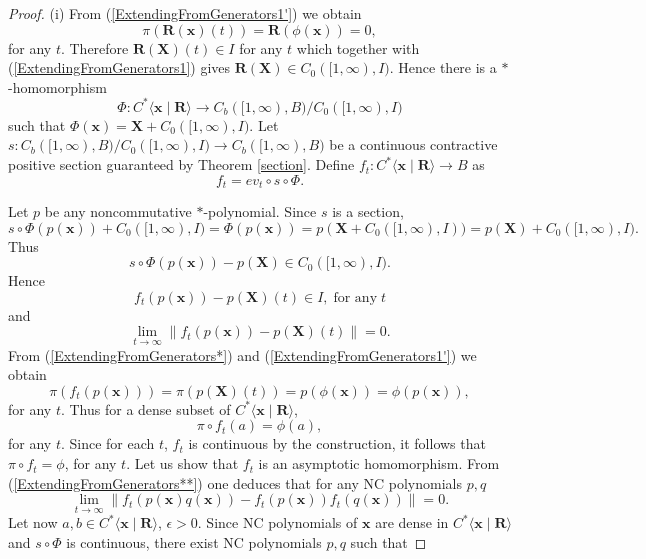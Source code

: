 \documentclass{article}%
\begin{document}
\begin{proof} (i)   From (\ref{ExtendingFromGenerators1'}) we obtain
$$\pi(\mathbf R(\mathbf x)(t)) = \mathbf R(\phi(\mathbf x)) =0,$$ for any $t$. Therefore $\mathbf R(\mathbf X)(t) \in I$ for any $t$ which together with (\ref{ExtendingFromGenerators1}) gives $\mathbf R(\mathbf X)\in C_0([1, \infty), I)$. Hence there is a $\ast$-homomorphism $$\Phi: C^*\langle \mathbf x\;|\;\mathbf R\rangle \to C_b([1, \infty), B)/C_0([1, \infty), I)$$ such that $\Phi(\mathbf x) = \mathbf X + C_0([1, \infty), I)$. Let
$s: C_b([1, \infty), B)/C_0([1, \infty), I) \to C_b([1, \infty), B)$ be a continuous contractive positive section guaranteed by Theorem \ref{section}. Define $f_t: C^*\langle \mathbf x\;|\;\mathbf R\rangle \to B$ as $$f_t = ev_t\circ s \circ \Phi.$$

Let $p$ be any noncommutative $\ast$-polynomial. Since $s$ is a section,
$$ s\circ \Phi(p(\mathbf x)) + C_0([1, \infty), I)   = \Phi(p(\mathbf x)) = p(\mathbf  X +  C_0([1, \infty), I)) = p(\mathbf X) + C_0([1, \infty), I).$$ Thus
$$s\circ \Phi(p(\mathbf x)) - p(\mathbf X) \in C_0([1, \infty), I).$$
Hence
\begin{equation}\label{ExtendingFromGenerators*} f_t(p(\mathbf x)) - p(\mathbf X)(t) \in I, \;\text{for any}\; t \end{equation}
and
\begin{equation}\label{ExtendingFromGenerators**} \lim_{t\to \infty} \|f_t(p(\mathbf x)) - p(\mathbf X)(t)\| = 0. \end{equation}
From (\ref{ExtendingFromGenerators*}) and (\ref{ExtendingFromGenerators1'}) we obtain
$$\pi(f_t(p(\mathbf x))) = \pi(p(\mathbf X)(t)) = p(\phi(\mathbf x)) = \phi(p(\mathbf x)),$$ for any $t$.  Thus for a dense subset of $C^*\langle \mathbf x\;|\;\mathbf R\rangle$,
$$\pi\circ f_t(a) = \phi(a),$$ for any $t$. Since for each $t$, $f_t$ is continuous by the construction, it follows that $\pi\circ f_t = \phi$, for any $t$.
Let us show that $f_t$ is an asymptotic homomorphism.
From (\ref{ExtendingFromGenerators**}) one deduces that for any NC polynomials $p, q$
\begin{equation}\label{ExtendingFromenerators0} \lim_{t\to\infty} \|f_t(p(\mathbf x)q(\mathbf x)) - f_t(p(\mathbf x))f_t(q(\mathbf x))\| =0.\end{equation} Let now $a, b \in C^*\langle \mathbf x\;|\;\mathbf R\rangle$, $\epsilon > 0$. Since NC polynomials of $\mathbf x$ are dense in
$C^*\langle \mathbf x\;|\;\mathbf R\rangle$ and $s\circ \Phi$ is continuous, there exist NC polynomials $p, q$ such that

\end{proof}
\end{document}

